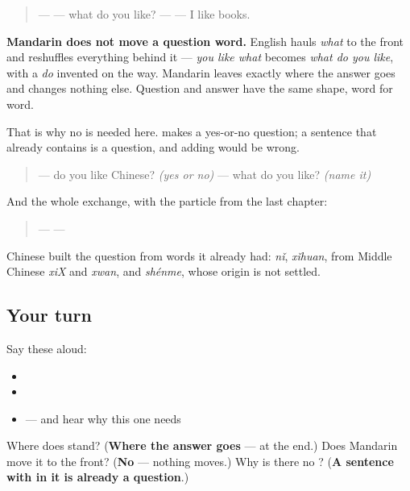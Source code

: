 \begin{quote}
— \textbf{} — what do you like? — \textbf{} — I like books.
\end{quote}

\textbf{Mandarin does not move a question word.} English hauls \emph{what} to the front and reshuffles everything behind it — \emph{you like what} becomes \emph{what do you like}, with a \emph{do} invented on the way. Mandarin leaves  exactly where the answer goes and changes nothing else. Question and answer have the same shape, word for word.

That is why no  is needed here.  makes a yes-or-no question; a sentence that already contains  is a question, and adding  would be wrong.

\begin{quote}
\textbf{} — do you like Chinese? \emph{(yes or no)} \textbf{} — what do you like? \emph{(name it)}
\end{quote}

And the whole exchange, with the particle from the last chapter:

\begin{quote}
— \textbf{} — \textbf{}
\end{quote}

\begin{cousinweb}
Chinese built the question from words it already had: \emph{nǐ}, \emph{xǐhuan}, from Middle Chinese \emph{xiX} and \emph{xwan}, and \emph{shénme}, whose origin is not settled.
\end{cousinweb}

\subsection*{Your turn}
Say these aloud:

\begin{itemize}
\raggedright
  \item {}
  \item {}
  \item {} — and hear why this one needs 
\end{itemize}

\begin{tcolorbox}[breakable,colback=teal!4,colframe=teal!35!black,title={Before you move on}]
Where does  stand? (\textbf{Where the answer goes} — at the end.) Does Mandarin move it to the front? (\textbf{No} — nothing moves.) Why is there no ? (\textbf{A sentence with  in it is already a question}.)
\end{tcolorbox}
